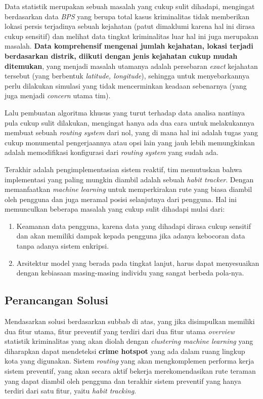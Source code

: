 Data statistik merupakan sebuah masalah yang cukup sulit dihadapi, mengingat berdasarkan data \textit{BPS} yang berupa total kasus kriminalitas tidak memberikan lokasi persis terjadinya sebuah kejahatan (patut dimaklumi karena hal ini dirasa cukup sensitif) dan melihat data tingkat kriminalitas luar hal ini juga merupakan masalah. \textbf{Data komprehensif mengenai jumlah kejahatan, lokasi terjadi berdasarkan distrik, diikuti dengan jenis kejahatan cukup mudah ditemukan}, yang menjadi masalah utamanya adalah persebaran \textit{exact} kejahatan tersebut (yang berbentuk \textit{latitude, longitude}), sehingga untuk menyebarkannya perlu dilakukan simulasi yang tidak mencerminkan keadaan sebenarnya (yang juga menjadi \textit{concern} utama tim).

Lalu pembuatan algoritma khusus yang turut terhadap data analisa nantinya pula cukup sulit dilakukan, mengingat hanya ada dua cara untuk melakukannya membuat sebuah \textit{routing system} dari nol, yang di mana hal ini adalah tugas yang cukup monumental pengerjaannya atau opsi lain yang jauh lebih memungkinkan adalah memodifikasi konfigurasi dari \textit{routing system} yang sudah ada.

Terakhir adalah pengimplementasian sistem reaktif, tim memutuskan bahwa implementasi yang paling mungkin diambil adalah sebuah \textit{habit tracker}. Dengan memanfaatkan \textit{machine learning} untuk memperkirakan rute yang biasa diambil oleh pengguna dan juga meramal posisi selanjutnya dari pengguna. Hal ini memunculkan beberapa masalah yang cukup sulit dihadapi mulai dari:
\begin{enumerate}
    \item Keamanan data pengguna, karena data yang dihadapi dirasa cukup sensitif dan akan memiliki dampak kepada pengguna jika adanya kebocoran data tanpa adanya sistem enkripsi.
    \item Arsitektur model yang berada pada tingkat lanjut, harus dapat menyesuaikan dengan kebiasaan masing-masing individu yang sangat berbeda pola-nya.
\end{enumerate}

\subsection{Perancangan Solusi}

Mendasarkan solusi berdasarkan subbab di atas, yang jika disimpulkan memiliki dua fitur utama, fitur preventif yang terdiri dari dua fitur utama \textit{overview} statistik kriminalitas yang akan diolah dengan \textit{clustering machine learning} yang diharapkan dapat mendeteksi \textbf{crime hotspot}\citep{CrimeHotspotsNIJ} yang ada dalam ruang lingkup kota yang digunakan. Sistem \textit{routing} yang akan mengkomplemen performa kerja sistem preventif, yang akan secara aktif bekerja merekomendasikan rute teraman yang dapat diambil oleh pengguna dan terakhir sistem preventif yang hanya terdiri dari satu fitur, yaitu \textit{habit tracking}.

